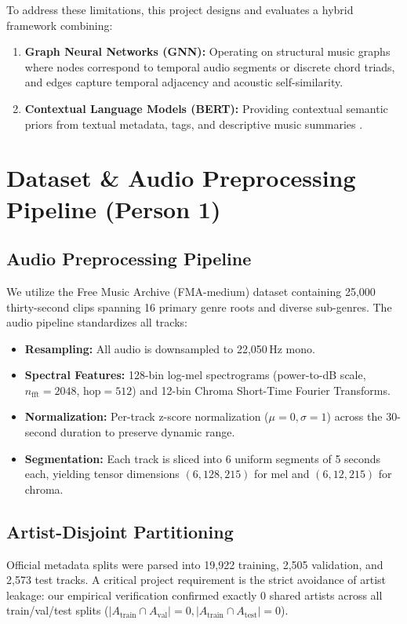 \documentclass{article}
\begin{document}
To address these limitations, this project designs and evaluates a hybrid framework combining:
\begin{enumerate}
    \item \textbf{Graph Neural Networks (GNN):} Operating on structural music graphs where nodes correspond to temporal audio segments or discrete chord triads, and edges capture temporal adjacency and acoustic self-similarity.
    \item \textbf{Contextual Language Models (BERT):} Providing contextual semantic priors from textual metadata, tags, and descriptive music summaries \cite{musiccaps2023}.
\end{enumerate}

\section{Dataset \& Audio Preprocessing Pipeline (Person 1)}
\subsection{Audio Preprocessing Pipeline}
We utilize the Free Music Archive (FMA-medium) dataset containing 25,000 thirty-second clips spanning 16 primary genre roots and diverse sub-genres. The audio pipeline standardizes all tracks:
\begin{itemize}
    \item \textbf{Resampling:} All audio is downsampled to 22,050\,Hz mono.
    \item \textbf{Spectral Features:} 128-bin log-mel spectrograms (power-to-dB scale, $n_{\text{fft}}=2048$, $\text{hop}=512$) and 12-bin Chroma Short-Time Fourier Transforms.
    \item \textbf{Normalization:} Per-track z-score normalization ($\mu=0, \sigma=1$) across the 30-second duration to preserve dynamic range.
    \item \textbf{Segmentation:} Each track is sliced into 6 uniform segments of 5 seconds each, yielding tensor dimensions $(6, 128, 215)$ for mel and $(6, 12, 215)$ for chroma.
\end{itemize}

\subsection{Artist-Disjoint Partitioning}
Official metadata splits were parsed into 19,922 training, 2,505 validation, and 2,573 test tracks. A critical project requirement is the strict avoidance of artist leakage: our empirical verification confirmed exactly 0 shared artists across all train/val/test splits ($|A_{\text{train}} \cap A_{\text{val}}| = 0, |A_{\text{train}} \cap A_{\text{test}}| = 0$).
\end{document}
